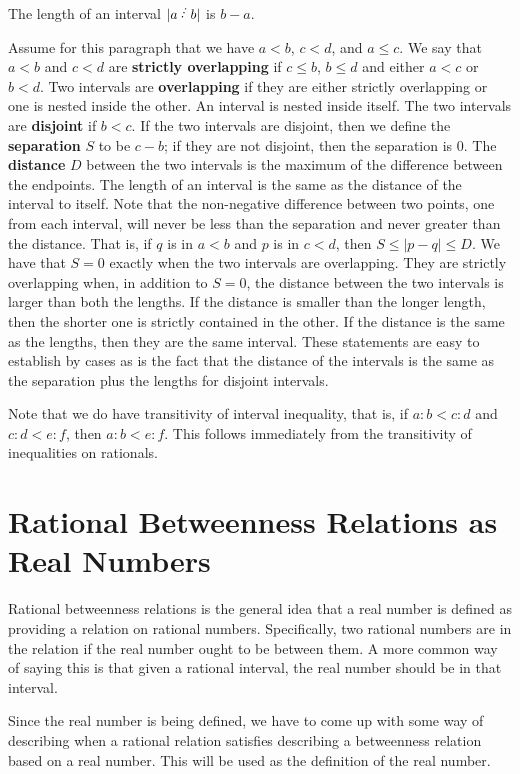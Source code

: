 \documentclass[12pt]{article}
\begin{document}
The length of an interval $|a \lte b |$ is $b-a$. 

Assume for this paragraph that we have $a \lt b$, $c \lt d$, and $a \leq c$. We say that $a\lt b$ and $c \lt d$ are \textbf{strictly overlapping} if $c \leq b$, $b \leq d$ and either $a < c$ or $b < d$. Two intervals are \textbf{overlapping} if they are either strictly overlapping or one is nested inside the other. An interval is nested inside itself. The two intervals are \textbf{disjoint} if $b < c$. If the two intervals are disjoint, then we define the \textbf{separation} $S$ to be $c-b$; if they are not disjoint, then the separation is 0.  The \textbf{distance} $D$ between the two intervals is the maximum of the difference between the endpoints. The length of an interval is the same as the distance of the interval to itself. Note that the non-negative difference between two points, one from each interval, will never be less than the separation and never greater than the distance. That is, if $q$ is in $a\lt b$ and $p$ is in $c \lt d$, then $S \leq |p-q| \leq D$. We have that  $S = 0$ exactly when the two intervals are overlapping. They are strictly overlapping when, in addition to $S=0$,  the distance between the two intervals is larger than both the lengths. If the distance is smaller than the longer length, then the shorter one is strictly contained in the other. If the distance is the same as the lengths, then they are the same interval. These statements are easy to establish by cases as is the fact that the distance of the intervals is the same as the separation plus the lengths for disjoint intervals. 

Note that we do have transitivity of interval inequality, that is, if $a:b < c:d$ and $c:d < e:f$, then $a:b < e:f$. This follows immediately from the transitivity of inequalities on rationals.

\section{Rational Betweenness Relations as Real Numbers}

Rational betweenness relations is the general idea that a real number is defined as providing a relation on rational numbers. Specifically, two rational numbers are in the relation if the real number ought to be between them. A more common way of saying this is that given a rational interval, the real number should be in that interval. 

Since the real number is being defined, we have to come up with some way of describing when a rational relation satisfies describing a betweenness relation based on a real number. This will be used as the definition of the real number. 
\end{document}

